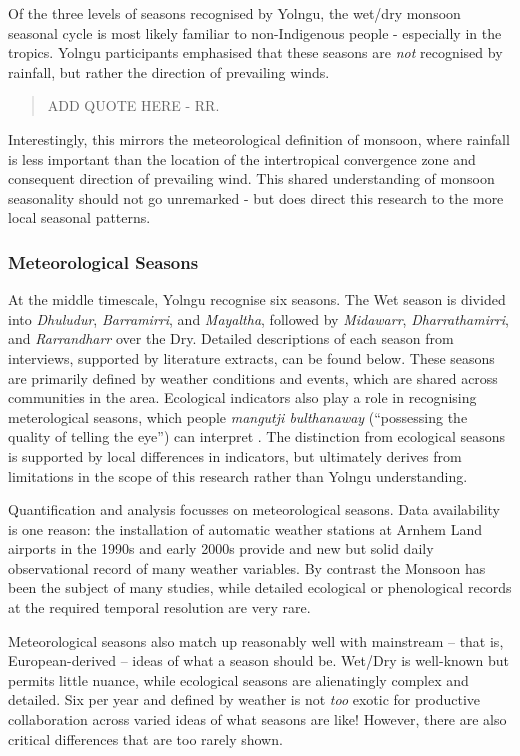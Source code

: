 Of the three levels of seasons recognised by Yolngu,
the wet/dry monsoon seasonal cycle is most likely familiar to non-Indigenous people -
especially in the tropics.  Yolngu participants emphasised that these seasons
are \emph{not} recognised by rainfall, but rather the direction of prevailing winds.

\blockquote{
    ADD QUOTE HERE - RR.
}

Interestingly, this mirrors the meteorological definition of monsoon,
where rainfall is less important than the location of the intertropical
convergence zone and consequent direction of prevailing wind.
This shared understanding of monsoon seasonality should not go unremarked -
but does direct this research to the more local seasonal patterns.


\subsubsection{Meteorological Seasons}

At the middle timescale, Yolngu recognise six seasons.
The Wet season is divided into \textit{Dhuludur}, \textit{Barramirri},
and \textit{Mayaltha}, followed by \textit{Midawarr}, \textit{Dharrathamirri},
and \textit{Rarrandharr} over the Dry.  Detailed descriptions of each
season from interviews, supported by literature extracts, can be found below.
%
These seasons are primarily defined by weather conditions and events,
which are shared across communities in the area.  Ecological indicators
also play a role in recognising meterological seasons, which people
\textit{mangutji bulthanaway} (``possessing the quality of telling the eye'')
can interpret \citep[p35]{atlas2014}.  The distinction from ecological
seasons is supported by local differences in indicators, but ultimately
derives from limitations in the scope of this research rather than
Yolngu understanding.

Quantification and analysis focusses on meteorological seasons.
Data availability is one reason:  the installation of automatic weather
stations at Arnhem Land airports in the 1990s and early 2000s provide
and new but solid daily observational record of many weather variables.
By contrast the Monsoon has been the subject of many studies, while
detailed ecological or phenological records at the required temporal
resolution are very rare.

Meteorological seasons also match up reasonably well with mainstream --
that is, European-derived -- ideas of what a season should be.  Wet/Dry
is well-known but permits little nuance, while ecological seasons are
alienatingly complex and detailed.  Six per year and defined by weather
is not \emph{too} exotic for productive collaboration across varied
ideas of what seasons are like!
%
However, there are also critical differences that are too rarely shown.

